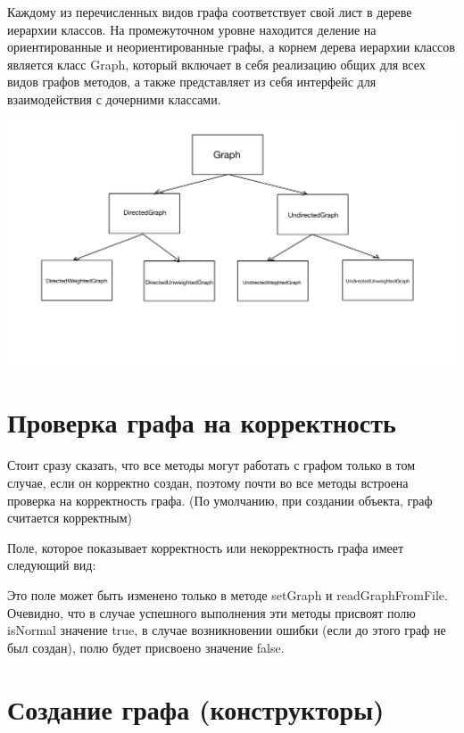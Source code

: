 \documentclass[bachelor, och, pract]{SCWorks}
\begin{document}
Каждому из перечисленных видов графа соответствует свой лист в дереве
иерархии классов. На промежуточном уровне находится деление на
ориентированные и неориентированные графы, а корнем дерева иерархии классов
является класс Graph, который включает в себя реализацию общих для всех
видов графов методов, а также представляет из себя интерфейс для взаимодействия
с дочерними классами.
\bigskip

\begin{center}
  \includegraphics[width=160mm]{1_ierarx.png}
\end{center}
\bigskip

\section{Проверка графа на корректность}

Стоит сразу сказать, что все методы могут работать с графом
только в том случае, если он корректно создан, поэтому почти во все
методы встроена проверка на корректность графа. (По умолчанию, при создании объекта,
граф считается корректным)
\bigskip

Поле, которое показывает корректность или некорректность графа имеет следующий вид:
\bigskip


\bigskip

Это поле может быть изменено только в методе setGraph и readGraphFromFile. Очевидно,
что в случае успешного выполнения эти методы присвоят полю isNormal значение true,
в случае возникновении ошибки (если до этого граф не был создан), полю будет
присвоено значение false.

\section{Создание графа (конструкторы)}
\end{document}
